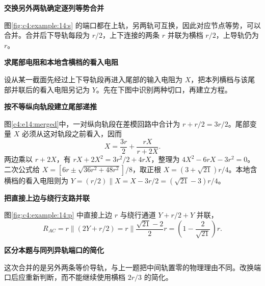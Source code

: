 \begin{solution}\textbf{交换另外两轨确定逐列等势合并}\par\nobreak
图\ref{fig:c4:example:14:s} 的端口都在上轨，另两轨可互换，因此对应节点等势，可以合并。合并后下导轨每段为 $r/2$，上下连接的两条 $r$ 并联为横档 $r/2$，上导轨仍为 $r$。



\par\medskip{}\noindent\textbf{求尾部电阻和本地含横档的看入电阻}\par\nobreak
设从某一截面先经过上下导轨段再进入尾部的输入电阻为 $X$，把本列横档与该尾部并联后的看入电阻另记为 $Y$。先在下图中识别两种切口，再建立方程。


\par\medskip{}\noindent\textbf{按不等纵向轨段建立尾部递推}\par\nobreak
图\ref{c4:e14:merged}中，一对纵向轨段在差模回路中合计为 $r+r/2=3r/2$。尾部变量 $X$ 必须从这对轨段之前看入，因而
\[
 X=\frac{3r}{2}+\frac{rX}{r+2X}.
\]
两边乘以 $r+2X$，有 $rX+2X^2=3r^2/2+4rX$，整理为 $4X^2-6rX-3r^2=0$。二次公式给
$X=[6r\pm\sqrt{36r^2+48r^2}]/8$，取正根 $X=(3+\sqrt{21})r/4$。本地含横档的看入电阻则为
$Y=(r/2)\parallel X=X-3r/2=(\sqrt{21}-3)r/4$。




\par\medskip{}\noindent\textbf{把直接上边与绕行支路并联}\par\nobreak
图\ref{fig:c4:example:14:p} 中直接上边 $r$ 与绕行通道 $Y+r/2+Y$ 并联，
\[
 R_{AC}=r\parallel(2Y+r/2)
 =r\parallel\frac{\sqrt{21}-2}{2}r
 =\left(1-\frac2{\sqrt{21}}\right)r.
\]


\par\medskip{}\noindent\textbf{区分本题与同列异轨端口的简化}\par\nobreak
这次合并的是另外两条等价导轨，与上一题把中间轨置零的物理理由不同。改换端口后应重新判断，而不能继续使用横档 $2r/3$ 的简化。\end{solution}
